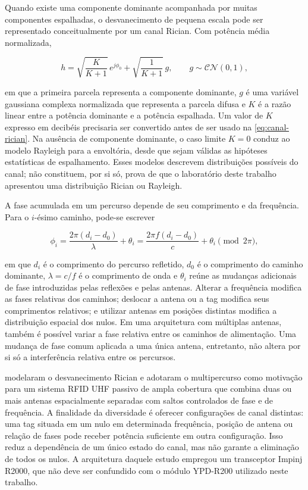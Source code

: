 Quando existe uma componente dominante acompanhada por muitas componentes espalhadas, o desvanecimento de pequena escala pode ser representado conceitualmente por um canal Rician. Com potência média normalizada,

\begin{equation}
    h = \sqrt{\frac{K}{K+1}}\,e^{j\phi_0}
        + \sqrt{\frac{1}{K+1}}\,g,
    \qquad g \sim \mathcal{CN}(0,1),
    \label{eq:canal-rician}
\end{equation}

em que a primeira parcela representa a componente dominante, $g$ é uma variável gaussiana complexa normalizada que representa a parcela difusa e $K$ é a razão linear entre a potência dominante e a potência espalhada. Um valor de $K$ expresso em decibéis precisaria ser convertido antes de ser usado na \autoref{eq:canal-rician}. Na ausência de componente dominante, o caso limite $K=0$ conduz ao modelo Rayleigh para a envoltória, desde que sejam válidas as hipóteses estatísticas de espalhamento. Esses modelos descrevem distribuições possíveis do canal; não constituem, por si só, prova de que o laboratório deste trabalho apresentou uma distribuição Rician ou Rayleigh.

A fase acumulada em um percurso depende de seu comprimento e da frequência. Para o $i$-ésimo caminho, pode-se escrever

\begin{equation}
    \phi_i = \frac{2\pi(d_i-d_0)}{\lambda} + \theta_i
           = \frac{2\pi f(d_i-d_0)}{c} + \theta_i
           \pmod{2\pi},
    \label{eq:fase-percurso}
\end{equation}

em que $d_i$ é o comprimento do percurso refletido, $d_0$ é o comprimento do caminho dominante, $\lambda=c/f$ é o comprimento de onda e $\theta_i$ reúne as mudanças adicionais de fase introduzidas pelas reflexões e pelas antenas. Alterar a frequência modifica as fases relativas dos caminhos; deslocar a antena ou a tag modifica seus comprimentos relativos; e utilizar antenas em posições distintas modifica a distribuição espacial dos nulos. Em uma arquitetura com múltiplas antenas, também é possível variar a fase relativa entre os caminhos de alimentação. Uma mudança de fase comum aplicada a uma única antena, entretanto, não altera por si só a interferência relativa entre os percursos.

 modelaram o desvanecimento Rician e adotaram o multipercurso como motivação para um sistema RFID UHF passivo de ampla cobertura que combina duas ou mais antenas espacialmente separadas com saltos controlados de fase e de frequência. A finalidade da diversidade é oferecer configurações de canal distintas: uma tag situada em um nulo em determinada frequência, posição de antena ou relação de fases pode receber potência suficiente em outra configuração. Isso reduz a dependência de um único estado do canal, mas não garante a eliminação de todos os nulos. A arquitetura daquele estudo empregou um transceptor Impinj R2000, que não deve ser confundido com o módulo YPD-R200 utilizado neste trabalho.

